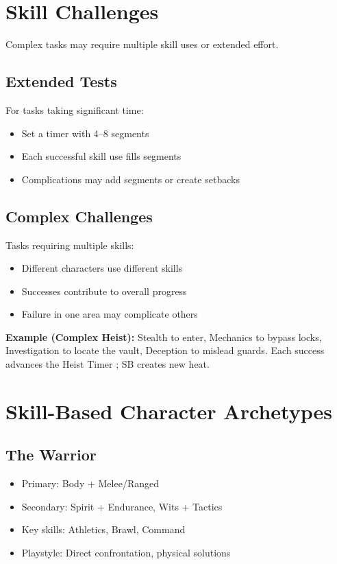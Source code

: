 \documentclass[11pt,twoside,openany]{book}
\begin{document}
\section*{Skill Challenges} 

Complex tasks may require multiple skill uses or extended effort.

\subsection*{Extended Tests}

For tasks taking significant time:
\begin{itemize}
\item Set a timer with 4--8 segments
\item Each successful skill use fills segments
\item Complications may add segments or create setbacks
\end{itemize}

\subsection*{Complex Challenges}

Tasks requiring multiple skills:
\begin{itemize}
\item Different characters use different skills
\item Successes contribute to overall progress
\item Failure in one area may complicate others
\end{itemize}

\textbf{Example (Complex Heist):} Stealth to enter, Mechanics to bypass locks, Investigation to locate the vault, Deception to mislead guards. Each success advances the Heist Timer ; SB creates new heat.

\section*{Skill-Based Character Archetypes} 

\subsection*{The Warrior}

\begin{itemize}
\item Primary: Body + Melee/Ranged
\item Secondary: Spirit + Endurance, Wits + Tactics
\item Key skills: Athletics, Brawl, Command
\item Playstyle: Direct confrontation, physical solutions
\end{itemize}
\end{document}

